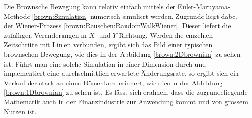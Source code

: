 Die Brownsche Bewegung kann relativ einfach mittels der Euler-Maruyama-Methode \ref{brown:Simulation} numerisch simuliert werden. Zugrunde liegt dabei der Wiener-Prozess \ref{brown:Rauschen:RandomWalkWiener}. Dieser liefert die zufälligen Veränderungen in $ X $- und $ Y $-Richtung. Werden die einzelnen Zeitschritte mit Linien verbunden, ergibt sich das Bild einer typischen brownschen Bewegung, wie dies in der Abbildung \ref{brown:2Dbrownian} zu sehen ist. Führt man eine solche Simulation in einer Dimension durch und implementiert eine durchschnittlich erwartete Änderungsrate, so ergibt sich ein Verlauf der stark an einen Börsenkurs erinnert, wie dies in der Abbildung \ref{brown:1Dbrownian} zu sehen ist. Es lässt sich erahnen, dass die zugrundeliegende Mathematik auch in der Finanzindustrie zur Anwendung kommt und von grossem Nutzen ist.

